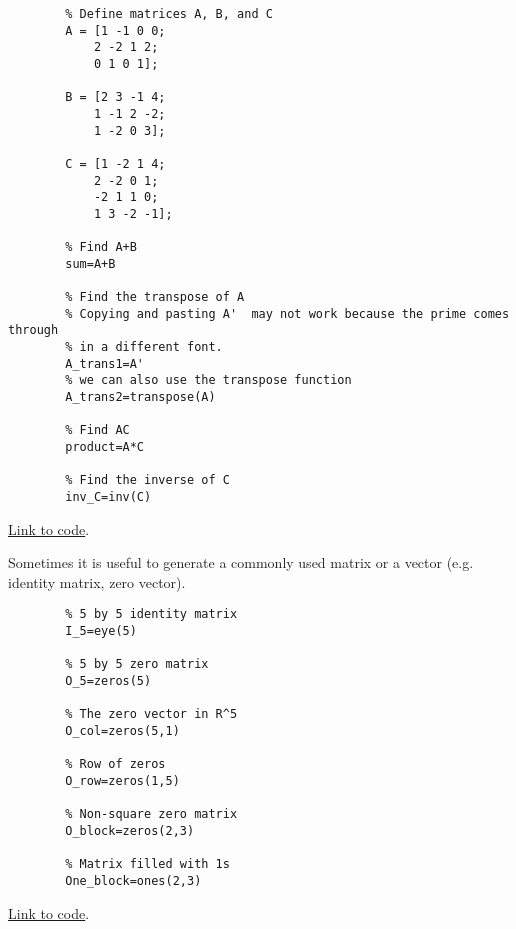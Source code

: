 \documentclass{ximera}
\begin{document}
\begin{template}\label{temp:matrixOps}

    \begin{verbatim}
        % Define matrices A, B, and C
        A = [1 -1 0 0;
            2 -2 1 2;
            0 1 0 1];
            
        B = [2 3 -1 4;
            1 -1 2 -2;
            1 -2 0 3];   
            
        C = [1 -2 1 4;
            2 -2 0 1;
            -2 1 1 0;
            1 3 -2 -1];     
            
        % Find A+B
        sum=A+B
        
        % Find the transpose of A
        % Copying and pasting A'  may not work because the prime comes through
        % in a different font.
        A_trans1=A'
        % we can also use the transpose function
        A_trans2=transpose(A)
        
        % Find AC
        product=A*C
        
        % Find the inverse of C
        inv_C=inv(C)
    \end{verbatim}
    
    \href{https://sagecell.sagemath.org/?z=eJxdUMGOwiAUvDfpP8zFqLuaFPRmOFCMP2GMIZVmSVYwhe7-vg-0tcqBMDNv3rzHDHvTWmdw1bGzjQmQK9QraHeBKgsJgSPDmqFCtSsLpMOx5mDgA66QZHYacFnUycaxScbtQOc2yTshOBk3p102Pb3qGZkitm-RlDHgrLLXSCxlURHLvSbdZjhYWkV-12UR-qvIj5GOPwax0y7cfDDwLSStfM4ME3Ke6v4NGu2gf4NHT0XvlrZ3TbTejTYuRnEhl5MoSb956_ylb6KQX-pjCOv-TPcYgSRCZyXoXqjlHXo6X7Q=&lang=octave&interacts=eJyLjgUAARUAuQ==}{Link to code}.
    \end{template}
    
    \begin{template}\label{temp:id_matrix}
    Sometimes it is useful to generate a commonly used matrix or a vector (e.g. identity matrix, zero vector). 
    
    \begin{verbatim}
        % 5 by 5 identity matrix
        I_5=eye(5)
        
        % 5 by 5 zero matrix
        O_5=zeros(5)
        
        % The zero vector in R^5
        O_col=zeros(5,1)
        
        % Row of zeros
        O_row=zeros(1,5)
        
        % Non-square zero matrix
        O_block=zeros(2,3)
        
        % Matrix filled with 1s
        One_block=ones(2,3)
    \end{verbatim}
    
    \href{https://sagecell.sagemath.org/?z=eJxdzT0OwjAMBeA9Uu7gpRJIYSgoIwdgAKSKGdQfV40IsUgDoZyepk06sHiwv_ecgYRqGIdq0DjlBniUzqoPZ4eb3OOAK7nmjLMsuS9aWsx5NGHRL-rS4UzeWDuyoAwUVxlkTTpZkUddkAdqp0AfjCUfTS5S44nMpn--Sov_vytN9T36rdhFf5zu0CqtsQGvXAd5KDcYA2Rw9j9PMkr_&lang=octave&interacts=eJyLjgUAARUAuQ==}{Link to code}.
    \end{template}
    
\end{document}
